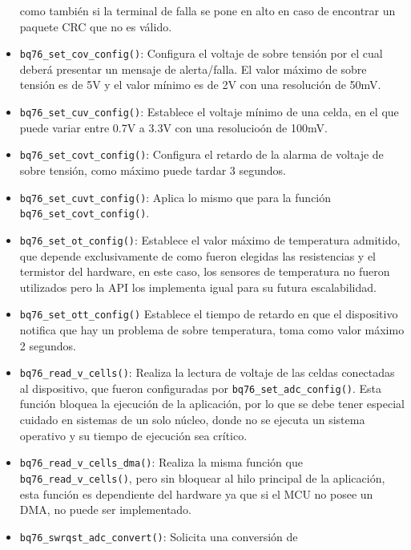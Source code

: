 \documentclass[10pt, a4paper]{article}
\begin{document}
\begin{itemize}
        como tambi\'en si la terminal de falla se pone en alto en caso de
        encontrar un paquete \acrshort{CRC} que no es v\'alido.
    \item \texttt{bq76\_set\_cov\_config()}: Configura el voltaje de sobre
        tensi\'on por el cual deber\'a presentar un mensaje de alerta/falla. El
        valor m\'aximo de sobre tensi\'on es de 5V y el valor m\'inimo es de 2V
        con una resoluci\'on de 50mV.
    \item \texttt{bq76\_set\_cuv\_config()}: Establece el voltaje mínimo de una
        celda, en el que puede variar entre 0.7V a 3.3V con una resolucio\'on de
        100mV.
    \item \texttt{bq76\_set\_covt\_config()}: Configura el retardo de la alarma 
        de voltaje de sobre tensión, como m\'aximo puede tardar 3 segundos.
    \item \texttt{bq76\_set\_cuvt\_config()}: Aplica lo mismo que para la
        funci\'on \texttt{bq76\_set\_covt\_config()}.
    \item \texttt{bq76\_set\_ot\_config()}: Establece el valor m\'aximo de
        temperatura admitido, que depende exclusivamente de como fueron elegidas
        las resistencias y el termistor del hardware, en este caso, los sensores
        de temperatura no fueron utilizados pero la \acrshort{API} los
        implementa igual para su futura escalabilidad.
    \item \texttt{bq76\_set\_ott\_config()} Establece el tiempo de retardo en
        que el dispositivo notifica que hay un problema de sobre temperatura,
        toma como valor m\'aximo 2 segundos.
    \item \texttt{bq76\_read\_v\_cells()}: Realiza la lectura de voltaje de las
        celdas conectadas al dispositivo, que fueron configuradas por
        \texttt{bq76_set_adc_config()}. Esta funci\'on bloquea la ejecuci\'on
        de la aplicaci\'on, por lo que se debe tener especial cuidado en
        sistemas de un solo n\'ucleo, donde no se ejecuta un sistema operativo y
        su tiempo de ejecuci\'on sea cr\'itico.
    \item \texttt{bq76\_read\_v\_cells\_dma()}: Realiza la misma funci\'on que
        \texttt{bq76\_read\_v\_cells()}, pero sin bloquear al hilo principal de
        la aplicaci\'on, esta funci\'on es dependiente del hardware ya que si el
        \acrshort{MCU} no posee un \acrshort{DMA}, no puede ser implementado.
    \item \texttt{bq76\_swrqst\_adc\_convert()}: Solicita una conversi\'on de

\end{itemize}
\end{document}
